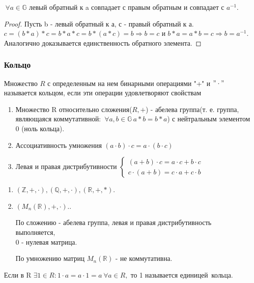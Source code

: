 \begin{proposition}
	\(\: \forall a\in \mathbb{G}\) левый обратный к a совпадает с правым обратным и совпадает с \(a^{-1}\).
\end{proposition}
\begin{proof}
	Пусть b - левый обратный к а, с - правый обратный к а. \(c = (b*a)*c = b*a*c = b*(a*c) = b\Longrightarrow b = c \text{ и }b*a=a*b=c\Longrightarrow b = a^{-1}\). Аналогично доказывается единственность обратного элемента.
\end{proof}

\subsubsection{Кольцо}
\begin{definition}
	Множество \(R\) с определенным на нем бинарными операциями "+" и \("\cdot"\) называется кольцом, если эти операции удовлетворяют свойствам 
	\begin{enumerate}
		\item Множество R относительно сложения(\(R, +\)) - абелева группа(т. е. группа, являющаяся коммутативной: 
		\(\: \forall a,b\in\mathbb{G} \: a * b = b * a\)) с нейтральным элементом 0 (ноль кольца).
		\item Ассоциативность умножения \((a\cdot b)\cdot c = a\cdot(b\cdot c)\)
		\item Левая и правая дистрибутивности \(\left\{\begin{gathered}
			(a+b)\cdot c = a\cdot c + b\cdot c \\
			c\cdot(a+b) = c\cdot a + c\cdot b
		\end{gathered}\right.\)
	\end{enumerate}
\end{definition}
\begin{example}
	\begin{enumerate}
		\item \((\mathbb{Z},+,\cdot), (\mathbb{Q}, +, \cdot), (\mathbb{R}, +, *)\). 
		\item \((M_n(\mathbb{R}), +, \cdot).\). 
		
		По сложению - абелева группа, левая и правая дистрибутивность выполняется, \\ 0 - нулевая матрица. 
		
		По умножению матриц \(M_n(\mathbb{R})\) - не коммутативна.
	\end{enumerate}
\end{example}
\begin{definition}
	Если в R \(\exists 1\in R: 1\cdot a = a\cdot1 = a \: \forall a\in R,\) то 1 называется единицей~кольца.
\end{definition}

